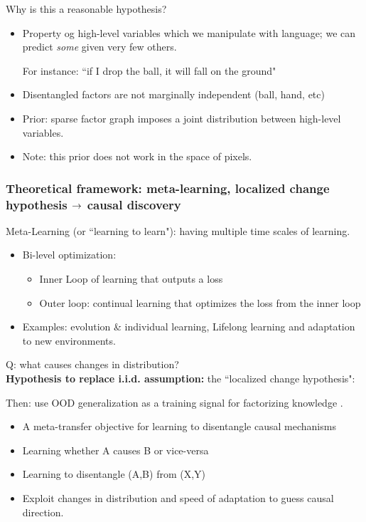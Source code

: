 Why is this a reasonable hypothesis?
\begin{itemize}
    \item Property og high-level variables which we manipulate with language; we can predict {\it some} given very few others.
    
    For instance: ``if I drop the ball, it will fall on the ground"
    
    \item Disentangled factors are not marginally independent (ball, hand, etc)
    \item Prior: sparse factor graph imposes a joint distribution between high-level variables.
    
    \item Note: this prior does not work in the space of pixels.
\end{itemize}




\spacerule
\subsubsection{Theoretical framework: meta-learning, localized change hypothesis $\rightarrow$ causal discovery}

Meta-Learning (or ``learning to learn"): having multiple time scales of learning.
\begin{itemize}
    \item Bi-level optimization:
    \begin{itemize}
        \item Inner Loop of learning that outputs a loss
        \item Outer loop: continual learning that optimizes the loss from the inner loop
    \end{itemize}
    \item Examples: evolution \& individual learning, Lifelong learning and adaptation to new environments.
\end{itemize}

Q: what causes changes in distribution? \\

{\bf Hypothesis to replace i.i.d. assumption:} the ``localized change hypothesis":


Then: use OOD generalization as a training signal for factorizing knowledge \cite{bengio2019meta}.
\begin{itemize}
    \item A meta-transfer objective for learning to disentangle causal mechanisms
    \item Learning whether A causes B or vice-versa
    \item Learning to disentangle (A,B) from (X,Y)
    \item Exploit changes in distribution and speed of adaptation to guess causal direction.
\end{itemize}

